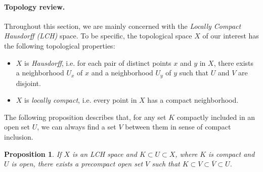 \documentclass{article}
\numberwithin{equation}{section}
\newcommand{\ol}{\overline}
\theoremstyle{plain}
\newtheorem{proposition}[theorem]{Proposition}
\theoremstyle{definition}
\begin{document}
\paragraph{Topology review.} Throughout this section, we are mainly concerned with the \textit{Locally Compact Hausdorff (LCH)} space. To be specific, the topological space $X$ of our interest has the following topological properties:
\begin{itemize}
	\item $X$ is \textit{Hausdorff}, i.e. for each pair of distinct points $x$ and $y$ in $X$, there exists a neighborhood $U_x$ of $x$ and a neighborhood $U_y$ of $y$ such that $U$ and $V$ are disjoint.
	\item $X$ is \textit{locally compact}, i.e. every point in $X$ has a compact neighborhood.
\end{itemize}
The following proposition describes that, for any set $K$ compactly included in an open set $U$, we can always find a set $V$ between them in sense of compact inclusion.
\begin{proposition}\label{precpbetween}
	If $X$ is an LCH space and  $K\subset U\subset X$, where $K$ is compact and $U$ is open, there exists a precompact open set $V$ such that $K\subset V\subset\ol{V}\subset U$.
\end{proposition}
\end{document}
